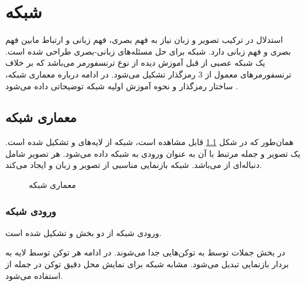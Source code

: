 \chapter{شبکه 
	}
\thispagestyle{empty}
استدلال در ترکیب تصویر و زبان نیاز به فهم بصری، فهم زبانی و ارتباط مابین فهم بصری و فهم زبانی دارد. شبکه 
 برای حل مسئله‌های زبانی-بصری طراحی شده است. 
  یک شبکه عصبی از قبل آموزش دیده 
از نوع ترنسفورمر می‌باشد که بر خلاف ترنسفورمرهای معمول از 3 رمزگذار
 تشکیل می‌شود. در ادامه درباره معماری شبکه، ساختار رمزگذار و نحوه آموزش اولیه
  شبکه توضیحاتی داده می‌شود \cite{tan2019lxmert}.


\section{معماری شبکه}
	همان‌طور که در شکل \ref{lxmert-arc} قابل مشاهده است، شبکه
	از لایه‌های 
	و 
	تشکیل شده است. یک تصویر و جمله مرتبط با آن به عنوان ورودی به شبکه داده می‌شود. هر تصویر شامل دنباله‌ای از 
	می‌باشد. شبکه
	بازنمایی مناسبی از تصویر و زبان و 
	ایجاد می‌کند.


\begin{figure}
	\caption{معماری شبکه  \cite{tan2019lxmert}}
	\label{lxmert-arc}
\end{figure}

\subsection{ورودی شبکه}
ورودی شبکه
از دو بخش
و 
تشکیل شده است.

در بخش
جملات توسط 
به توکن‌هایی جدا می‌شوند. در ادامه هر توکن توسط لایه
به بردار بازنمایی تبدیل می‌شود. مشابه شبکه
\cite{devlin-etal-2019-bert}
برای نمایش محل دقیق توکن در جمله از
استفاده می‌شود.

